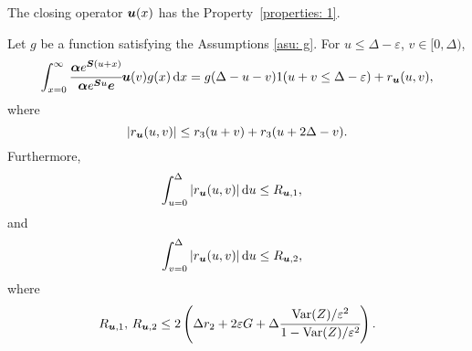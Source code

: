 \begin{cor}\label{cor: cond bnd 2 U}
	The closing operator \(\boldsymbol u(x)\) has the Property~\ref{properties: 1}.

	Let \(g\) be a function satisfying the Assumptions \ref{asu: g}. For \(u\leq \Delta-\varepsilon \), \(v\in[ 0,\Delta)\), 
	\[\int_{x=0}^\infty \cfrac{\boldsymbol \alpha  e^{\boldsymbol{S} (u+x)} }{\boldsymbol \alpha  e^{\boldsymbol{S} u} \boldsymbol e} {\boldsymbol u}(v)g(x)\, \mathrm{d} x = g(\Delta-u-v) 1(u+v\leq\Delta-\varepsilon) + r_{{\boldsymbol u}} (u,v),\]
	where 
	\[\left|r_{\boldsymbol u} (u,v)\right|\leq r_3 (u+v) + r_3 (u+2\Delta - v).\]
	Furthermore,  
	\begin{align*}
		&\int_{u=0}^{\Delta}| r_{{\boldsymbol u}}(u,v)|\, \mathrm{d} u
		\leq R_{{{\boldsymbol u}},1},
	\end{align*}
	and
	\begin{align*}
		&\int_{v=0}^{\Delta}| r_{{\boldsymbol u}}(u,v)|\, \mathrm{d} u
		\leq R_{{{\boldsymbol u}},2},
	\end{align*}
	where 
	\[R_{{{\boldsymbol u}},1},\, R_{{{\boldsymbol u}},2} \leq 2\left(\Delta r_2 + 2\varepsilon G + \Delta\cfrac{\mathrm{Var}(Z)/\varepsilon^2}{1-\mathrm{Var}(Z)/\varepsilon^2}\right).\]
\end{cor}
